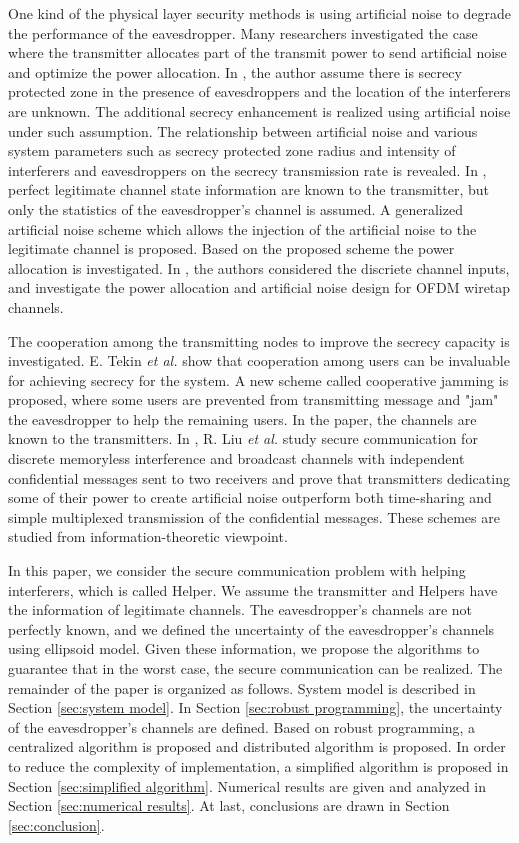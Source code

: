 \documentclass[conference]{IEEEtran}
\begin{document}
One kind of the physical layer security methods is using artificial noise to degrade the performance of the eavesdropper. Many researchers investigated the case where the transmitter allocates part of the transmit power to send artificial noise and optimize the power allocation. In \cite{chae2014enhanced}, the author assume there is secrecy protected zone in the presence of eavesdroppers and the location of the interferers are unknown. The additional secrecy enhancement is realized using artificial noise under such assumption. The relationship between artificial noise and various system parameters such as secrecy protected zone radius and intensity of interferers and eavesdroppers on the secrecy transmission rate is revealed.  In \cite{lin2013secrecy}, perfect legitimate channel state information are known to the transmitter, but only the statistics of the eavesdropper's channel is assumed. A generalized artificial noise scheme which allows the injection of the artificial noise to the legitimate channel is proposed. Based on the proposed scheme the power allocation is investigated. In \cite{qin2013power}, the authors considered the discriete channel inputs, and investigate the power allocation and artificial noise design for OFDM wiretap channels. 

The cooperation among the transmitting nodes to improve the secrecy capacity is investigated. E. Tekin \emph{et al.} \cite{tekin2008general} show that cooperation among users can be
invaluable for achieving secrecy for the system. A new scheme called cooperative jamming is proposed,  where some users are prevented from transmitting message and "jam" the eavesdropper to help the remaining users. In the paper, the channels are known to the transmitters. In \cite{liu2008discrete}, R. Liu \emph{et al.} study secure communication for discrete memoryless interference and broadcast channels with independent
confidential messages sent to two receivers and prove that transmitters dedicating some of their power to create artificial noise outperform both time-sharing and simple multiplexed transmission of the confidential messages. These schemes are studied from information-theoretic viewpoint. 


In this paper, we consider the secure communication problem with helping interferers, which is called Helper. We assume the transmitter and Helpers have the information of legitimate channels.  The eavesdropper's channels are not perfectly known, and we defined the uncertainty of the eavesdropper's channels using ellipsoid model. Given these information, we propose the algorithms to guarantee that in the worst case, the secure communication can be realized. The remainder of the paper is organized as follows. System model is described in Section \ref{sec:system model}. In Section \ref{sec:robust programming}, the uncertainty of the eavesdropper's channels are defined. Based on robust programming, a centralized algorithm is proposed and distributed algorithm is proposed. In order to reduce the complexity of implementation, a simplified algorithm is proposed in Section \ref{sec:simplified algorithm}. Numerical results are given and analyzed in Section \ref{sec:numerical results}. At last, conclusions are drawn in Section \ref{sec:conclusion}.
\end{document}
